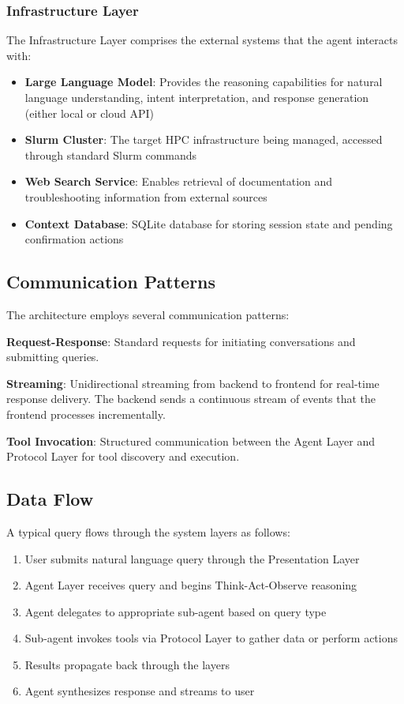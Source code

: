 \subsubsection{Infrastructure Layer}

The Infrastructure Layer comprises the external systems that the agent interacts with:

\begin{itemize}
    \item \textbf{Large Language Model}: Provides the reasoning capabilities for natural language understanding, intent interpretation, and response generation (either local or cloud API)
    \item \textbf{Slurm Cluster}: The target HPC infrastructure being managed, accessed through standard Slurm commands
    \item \textbf{Web Search Service}: Enables retrieval of documentation and troubleshooting information from external sources
    \item \textbf{Context Database}: SQLite database for storing session state and pending confirmation actions
\end{itemize}

\subsection{Communication Patterns}

The architecture employs several communication patterns:

\textbf{Request-Response}: Standard requests for initiating conversations and submitting queries.

\textbf{Streaming}: Unidirectional streaming from backend to frontend for real-time response delivery. The backend sends a continuous stream of events that the frontend processes incrementally.

\textbf{Tool Invocation}: Structured communication between the Agent Layer and Protocol Layer for tool discovery and execution.


\subsection{Data Flow}

A typical query flows through the system layers as follows:
\begin{enumerate}
    \item User submits natural language query through the Presentation Layer
    \item Agent Layer receives query and begins Think-Act-Observe reasoning
    \item Agent delegates to appropriate sub-agent based on query type
    \item Sub-agent invokes tools via Protocol Layer to gather data or perform actions
    \item Results propagate back through the layers
    \item Agent synthesizes response and streams to user
\end{enumerate}

